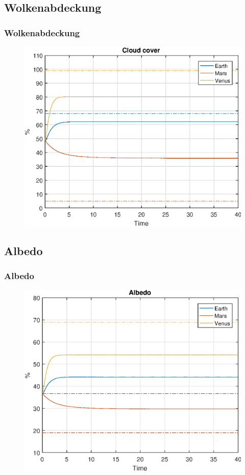 \documentclass{beamer}
\begin{document}
\subsection{Wolkenabdeckung}
\begin{frame}
	\frametitle{Wolkenabdeckung}
		\begin{figure}
			\includegraphics[width=0.9\linewidth]{Matlab/figures/cloudCover.eps}
		\end{figure}
\end{frame}

\subsection{Albedo}
\begin{frame}
	\frametitle{Albedo}
		\begin{figure}
			\includegraphics[width=0.9\linewidth]{Matlab/figures/albedo.eps}
		\end{figure}
\end{frame}
\end{document}
